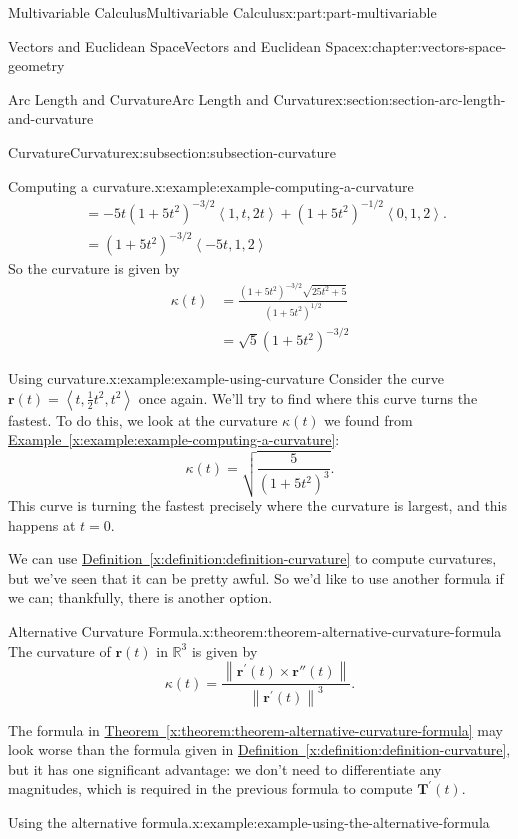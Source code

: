 \documentclass[twoside,10pt,]{tufte-book}
\newcommand{\xreffont}{\relax}
\numberwithin{equation}{part}
\newcommand{\RR}{\mathbb{R}}
\newcommand{\norm}[1]{\left\| #1 \right\|}
\newcommand{\dotprod}[1]{\left\langle #1 \right\rangle}
\begin{document}
\begin{partptx}{Multivariable Calculus}{}{Multivariable Calculus}{}{}{x:part:part-multivariable}
\begin{chapterptx}{Vectors and Euclidean Space}{}{Vectors and Euclidean Space}{}{}{x:chapter:vectors-space-geometry}
\begin{sectionptx}{Arc Length and Curvature}{}{Arc Length and Curvature}{}{}{x:section:section-arc-length-and-curvature}
\begin{subsectionptx}{Curvature}{}{Curvature}{}{}{x:subsection:subsection-curvature}
\begin{example}{Computing a curvature.}{x:example:example-computing-a-curvature}
\begin{align*}
& = -5t(1+5t^{2})^{-3/2}\dotprod{1,t,2t} + (1 + 5t^{2})^{-1/2}\dotprod{0,1,2}. \\
& = (1+5t^{2})^{-3/2}\dotprod{-5t,1,2} 
\end{align*}
So the curvature is given by%
%
\begin{align*}
\kappa(t) & = \frac{(1+5t^{2})^{-3/2}\sqrt{25t^{2}+5}}{(1+5t^{2})^{1/2}} \\
& = \sqrt{5}(1+5t^{2})^{-3/2} 
\end{align*}
\end{example}
\begin{example}{Using curvature.}{x:example:example-using-curvature}%
Consider the curve \(\mathbf{r}(t) = \dotprod{t,\frac{1}{2}t^{2},t^{2}}\) once again. We'll try to find where this curve turns the fastest. To do this, we look at the curvature \(\kappa(t)\) we found from \hyperref[x:example:example-computing-a-curvature]{Example~{\xreffont\ref{x:example:example-computing-a-curvature}}}:%
%
\begin{equation*}
\kappa(t) = \sqrt{\frac{5}{(1+5t^{2})^{3}}}.
\end{equation*}
This curve is turning the fastest precisely where the curvature is largest, and this happens at \(t=0\).%
\end{example}
We can use \hyperref[x:definition:definition-curvature]{Definition~{\xreffont\ref{x:definition:definition-curvature}}} to compute curvatures, but we've seen that it can be pretty awful. So we'd like to use another formula if we can; thankfully, there is another option.%
\begin{theorem}{Alternative Curvature Formula.}{}{x:theorem:theorem-alternative-curvature-formula}%
%
The curvature of \(\mathbf{r}(t)\) in \(\RR^{3}\) is given by%
%
\begin{equation*}
\kappa(t) = \frac{\norm{\mathbf{r}^{\prime}(t)\times\mathbf{r}''(t)}}{\norm{\mathbf{r}^{\prime}(t)}^{3}}.
\end{equation*}
\end{theorem}
The formula in \hyperref[x:theorem:theorem-alternative-curvature-formula]{Theorem~{\xreffont\ref{x:theorem:theorem-alternative-curvature-formula}}} may look worse than the formula given in \hyperref[x:definition:definition-curvature]{Definition~{\xreffont\ref{x:definition:definition-curvature}}}, but it has one significant advantage: we don't need to differentiate any magnitudes, which is required in the previous formula to compute \(\mathbf{T}^\prime(t)\).%
\begin{example}{Using the alternative formula.}{x:example:example-using-the-alternative-formula}%

\end{example}
\end{subsectionptx}
\end{sectionptx}
\end{chapterptx}
\end{partptx}
\end{document}
